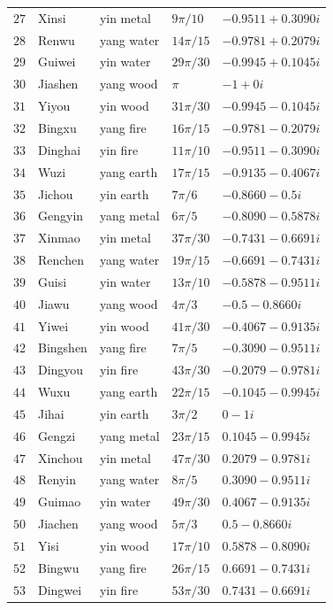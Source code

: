 \begin{longtable}{>{\centering\arraybackslash}p{0.8cm}>{\centering\arraybackslash}p{2.4cm}>{\centering\arraybackslash}p{2.2cm}>{\centering\arraybackslash}p{2cm}>{\centering\arraybackslash}p{3.5cm}}
$27$ & Xinsi & yin metal & $9\pi/10$ & $-0.9511+0.3090i$ \\
$28$ & Renwu & yang water & $14\pi/15$ & $-0.9781+0.2079i$ \\
$29$ & Guiwei & yin water & $29\pi/30$ & $-0.9945+0.1045i$ \\
$30$ & Jiashen & yang wood & $\pi$ & $-1+0i$ \\
$31$ & Yiyou & yin wood & $31\pi/30$ & $-0.9945-0.1045i$ \\
$32$ & Bingxu & yang fire & $16\pi/15$ & $-0.9781-0.2079i$ \\
$33$ & Dinghai & yin fire & $11\pi/10$ & $-0.9511-0.3090i$ \\
$34$ & Wuzi & yang earth & $17\pi/15$ & $-0.9135-0.4067i$ \\
$35$ & Jichou & yin earth & $7\pi/6$ & $-0.8660-0.5i$ \\
$36$ & Gengyin & yang metal & $6\pi/5$ & $-0.8090-0.5878i$ \\
$37$ & Xinmao & yin metal & $37\pi/30$ & $-0.7431-0.6691i$ \\
$38$ & Renchen & yang water & $19\pi/15$ & $-0.6691-0.7431i$ \\
$39$ & Guisi & yin water & $13\pi/10$ & $-0.5878-0.9511i$ \\
$40$ & Jiawu & yang wood & $4\pi/3$ & $-0.5-0.8660i$ \\
$41$ & Yiwei & yin wood & $41\pi/30$ & $-0.4067-0.9135i$ \\
$42$ & Bingshen & yang fire & $7\pi/5$ & $-0.3090-0.9511i$ \\
$43$ & Dingyou & yin fire & $43\pi/30$ & $-0.2079-0.9781i$ \\
$44$ & Wuxu & yang earth & $22\pi/15$ & $-0.1045-0.9945i$ \\
$45$ & Jihai & yin earth & $3\pi/2$ & $0-1i$ \\
$46$ & Gengzi & yang metal & $23\pi/15$ & $0.1045-0.9945i$ \\
$47$ & Xinchou & yin metal & $47\pi/30$ & $0.2079-0.9781i$ \\
$48$ & Renyin & yang water & $8\pi/5$ & $0.3090-0.9511i$ \\
$49$ & Guimao & yin water & $49\pi/30$ & $0.4067-0.9135i$ \\
$50$ & Jiachen & yang wood & $5\pi/3$ & $0.5-0.8660i$ \\
$51$ & Yisi & yin wood & $17\pi/10$ & $0.5878-0.8090i$ \\
$52$ & Bingwu & yang fire & $26\pi/15$ & $0.6691-0.7431i$ \\
$53$ & Dingwei & yin fire & $53\pi/30$ & $0.7431-0.6691i$ \\

\end{longtable}
